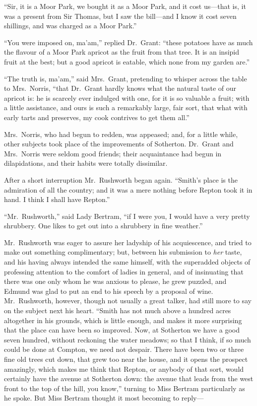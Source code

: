 ``Sir, it is a Moor Park, we bought it as a Moor Park,
and it cost us---that is, it was a present from Sir Thomas,
but I saw the bill---and I know it cost seven shillings,
and was charged as a Moor Park.''

``You were imposed on, ma'am,'' replied Dr.\ Grant:
``these potatoes have as much the flavour of a Moor Park
apricot as the fruit from that tree.  It is an insipid
fruit at the best; but a good apricot is eatable,
which none from my garden are.''

``The truth is, ma'am,'' said Mrs.\ Grant, pretending to
whisper across the table to Mrs.\ Norris, ``that Dr.\ Grant
hardly knows what the natural taste of our apricot is:
he is scarcely ever indulged with one, for it is so
valuable a fruit; with a little assistance, and ours is
such a remarkably large, fair sort, that what with early
tarts and preserves, my cook contrives to get them all.''

Mrs.\ Norris, who had begun to redden, was appeased;
and, for a little while, other subjects took place of the
improvements of Sotherton.  Dr.\ Grant and Mrs.\ Norris
were seldom good friends; their acquaintance had begun
in dilapidations, and their habits were totally dissimilar.

After a short interruption Mr.\ Rushworth began again.
``Smith's place is the admiration of all the country;
and it was a mere nothing before Repton took it in hand.
I think I shall have Repton.''

``Mr.\ Rushworth,'' said Lady Bertram, ``if I were you,
I would have a very pretty shrubbery.  One likes to get
out into a shrubbery in fine weather.''

Mr.\ Rushworth was eager to assure her ladyship of his
acquiescence, and tried to make out something complimentary;
but, between his submission to \emph{her} taste, and his having
always intended the same himself, with the superadded
objects of professing attention to the comfort of ladies
in general, and of insinuating that there was one only whom
he was anxious to please, he grew puzzled, and Edmund was
glad to put an end to his speech by a proposal of wine.
Mr.\ Rushworth, however, though not usually a great talker,
had still more to say on the subject next his heart.
``Smith has not much above a hundred acres altogether
in his grounds, which is little enough, and makes it more
surprising that the place can have been so improved.
Now, at Sotherton we have a good seven hundred,
without reckoning the water meadows; so that I think,
if so much could be done at Compton, we need not despair.
There have been two or three fine old trees cut down, that grew
too near the house, and it opens the prospect amazingly,
which makes me think that Repton, or anybody of that sort,
would certainly have the avenue at Sotherton down:  the avenue
that leads from the west front to the top of the hill,
you know,'' turning to Miss Bertram particularly as he spoke.
But Miss Bertram thought it most becoming to reply---%

